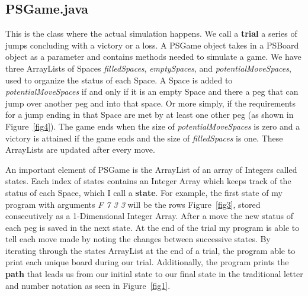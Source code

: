 \documentclass{article}
\begin{document}
\subsection{PSGame.java}
\label{2.3PSGame}
This is the class where the actual simulation happens. We call a \textbf{trial} a series of jumps concluding with a victory or a loss. A PSGame object takes in a PSBoard object as a parameter and contains methods needed to simulate a game. We have three ArrayLists of Spaces \textit{filledSpaces}, \textit{emptySpaces}, and \textit{potentialMoveSpaces}, used to organize the status of each Space. A Space is added to \textit{potentialMoveSpaces} if and only if it is an empty Space and there a peg that can jump over another peg and into that space. Or more simply, if the requirements for a jump ending in that Space are met by at least one other peg (as shown in Figure~\ref{fig4}). The game ends when the size of \textit{potentialMoveSpaces} is zero and a victory is attained if the game ends and the size of \textit{filledSpaces} is one. These ArrayLists are updated after every move.

An important element of PSGame is the ArrayList of an array of Integers called states. Each index of states contains an Integer Array which keeps track of the status of each Space, which I call a \textbf{state}. For example, the first state of my program with arguments \textit{F 7 3 3} will be the rows Figure~\ref{fig3}, stored consecutively as a 1-Dimensional Integer Array.  After a move the new status of each peg is saved in the next state. At the end of the trial my program is able to tell each move made by noting the changes between successive states. By iterating through the states ArrayList at the end of a trial, the program able to print each unique board during our trial. Additionally, the program prints the \textbf{path} that leads us from our initial state to our final state in the traditional letter and number notation as seen in Figure~\ref{fig1}.
\end{document}
